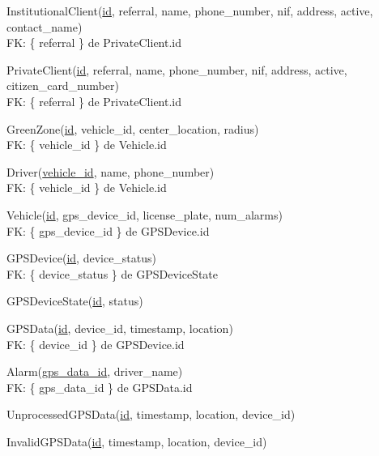 \documentclass[parskip=full]{scrreprt}
\author{André Páscoa A48089}
\date{03/04/2022}
\begin{document}

    InstitutionalClient(\underline{id}, referral, name, phone\_number, nif, address, active, contact\_name)\\
    FK: \{ referral \} de PrivateClient.id

    PrivateClient(\underline{id}, referral, name, phone\_number, nif,
    address, active, citizen\_card\_number)\\
    FK: \{ referral \} de PrivateClient.id

    GreenZone(\underline{id}, vehicle\_id, center\_location, radius)\\
    FK: \{ vehicle\_id \} de Vehicle.id

    Driver(\underline{vehicle\_id}, name, phone\_number)\\
    FK: \{ vehicle\_id \} de Vehicle.id

    Vehicle(\underline{id}, gps\_device\_id, license\_plate, num\_alarms)\\
    FK: \{ gps\_device\_id \} de GPSDevice.id

    GPSDevice(\underline{id}, device\_status)\\
    FK: \{ device\_status \} de GPSDeviceState

    GPSDeviceState(\underline{id}, status)

    GPSData(\underline{id}, device\_id, timestamp, location)\\
    FK: \{ device\_id \} de GPSDevice.id

    Alarm(\underline{gps\_data\_id}, driver\_name)\\
    FK: \{ gps\_data\_id \} de GPSData.id

    UnprocessedGPSData(\underline{id}, timestamp, location, device\_id)

    InvalidGPSData(\underline{id}, timestamp, location, device\_id)
\end{document}
